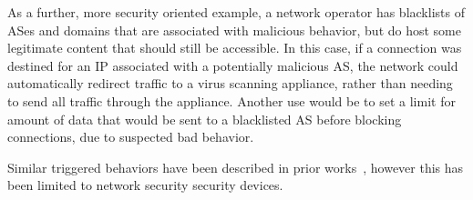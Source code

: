 \documentclass{sig-alternate}
\newcommand\tti[1]{\small\texttt{#1}\normalsize}
\begin{document}
As a further, more security oriented example, a network operator has blacklists of ASes and domains that are associated with malicious behavior, but do host some legitimate content that should still be accessible. In this case, if a connection was destined for an IP associated with a potentially malicious AS, the network could automatically redirect traffic to a virus scanning appliance, rather than needing to send all traffic through the appliance. Another use would be to set a limit for amount of data that would be sent to a blacklisted AS before blocking connections, due to suspected bad behavior.

Similar triggered behaviors have been described in prior works~\cite{cloudwatcher}\cite{opensafe}, however this has been limited to network security security devices.

\begin{comment}
\section{Example Behaviors}
\label{sec:examples}
Before going into the design, a few examples follow. This is in Pyretic syntax~\cite{pyretic}, where \tti{>}\tti{>} is sequential composition (operations run in order) and \tti{+} is parallel composition (operations run in parallel). 

\begin{Verbatim}[fontsize=\small]
  traffic_in_bytes(to = 'BobsPC', 
                   content = 'video',
                   timespan = 'monthly') > 10**9 >>
      rate_limit(to = 'BobsPC', 
                content = 'video', 
                bandwidth = 65536)
\end{Verbatim}

The example above is a variation on the video bandwidth limitation example. In this case, we only care if Bob's PC is downloading more then 10 gigabytes of video traffic in a month. If it does reach this limit, then we want to limit the bandwidth to 64 kilobytes per second.

\begin{Verbatim}[fontsize=\small]
  match_AS(pkt.srcip, AS = '12345')) >>
      drop()
\end{Verbatim}

The second example is simpler. We are see if a packet came from a AS 12345. If so, we want to drop it. Implicitly, if we do not drop a packet, it will be forwarded.
\end{comment}
\end{document}
